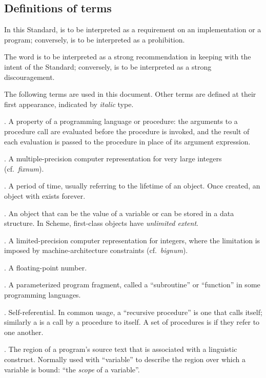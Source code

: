 \subsection*{Definitions of terms}

\vest In this Standard,  is to be interpreted as a
requirement on an implementation or a program; conversely,
 is to be interpreted as a prohibition.

\vest The word  is to be interpreted as a strong
recommendation in keeping with the intent of the Standard; conversely,
 is to be interpreted as a strong discouragement.

The following terms are used in this document.  Other terms are
defined at their first appearance, indicated by {\it italic\/} type.

. A property of a programming language or
procedure: the arguments to a procedure call are evaluated before the
procedure is invoked, and the result of each evaluation is passed to
the procedure in place of its argument expression.

. A multiple-precision computer representation for very
large integers (cf.~{\it fixnum}).

. A period of time, usually referring to the lifetime of
an object.  Once created, an object with 
exists forever.

. An object that can be the value of a
variable or can be stored in a data structure.  In Scheme, first-class
objects have {\it unlimited extent}.

. A limited-precision computer representation
for integers, where the limitation is imposed by machine-architecture
constraints (cf.~{\it bignum}).

. A floating-point number.

. A parameterized program fragment, called a
``subroutine'' or ``function'' in some programming languages.

. Self-referential.  In common usage, a
``recursive procedure'' is one that calls itself; similarly a
 is a call by a procedure to itself.  A set of procedures
is  if they refer to one another.

. The region of a program's source text that is associated
with a linguistic construct.  Normally used with ``variable'' to
describe the region over which a variable is bound: ``the {\it scope}
of a variable''.

